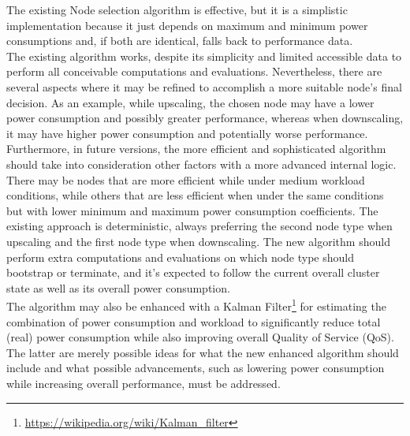 The existing Node selection algorithm is effective, but it is a simplistic implementation
because it just depends on maximum and minimum power consumptions and, if both
are identical, falls back to performance data. \\ %
The existing algorithm works, despite its simplicity and limited accessible data
to perform all conceivable computations and evaluations. Nevertheless, there are
several aspects where it may be refined to accomplish a more suitable node's
final decision. As an example, while upscaling, the chosen node may have a lower
power consumption and possibly greater performance, whereas when downscaling, it
may have higher power consumption and potentially worse performance. Furthermore,
in future versions, the more efficient and sophisticated algorithm should take
into consideration other factors with a more advanced internal logic. There may be
nodes that are more efficient while under medium workload conditions, while
others that are less efficient when under the same conditions but with lower
minimum and maximum power consumption coefficients. The existing approach is deterministic,
always preferring the second node type when upscaling and the first node type
when downscaling. The new algorithm should perform extra computations and evaluations
on which node type should bootstrap or terminate, and it's expected to follow
the current overall cluster state as well as its overall power consumption. \\ %
The algorithm may also be enhanced with a Kalman Filter\footnote{\url{https://wikipedia.org/wiki/Kalman_filter}}
for estimating the combination of power consumption and workload to
significantly reduce total (real) power consumption while also improving overall
Quality of Service (QoS). \\ %
The latter are merely possible ideas for what the new enhanced algorithm should
include and what possible advancements, such as lowering power consumption while
increasing overall performance, must be addressed. \\ %

